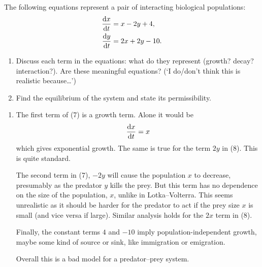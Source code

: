 \documentclass[a4paper,12pt]{article}
\begin{document}
\begin{enumerate}
    { %
      The following equations represent a pair of interacting biological populations:
      \begin{align}
        \fd{x}{t} &= x -2y + 4,\\
        \fd{y}{t} &= 2x + 2y -10.
      \end{align}
      \begin{enumerate}
        \item Discuss each term in the equations: what do they represent (growth? decay? interaction?). Are these meaningful equations? (`I do/don't think this is realistic because\dots')
        \item Find the equilibrium of the system and state its permissibility. %
      \end{enumerate}
    }
    { %
      \begin{enumerate}
        \item
          The first term of (7) is a growth term. Alone it would be
          \begin{equation}
            \fd{x}{t} = x
          \end{equation}
          which gives exponential growth. The same is true for the term $2y$ in (8). This is quite standard.

          The second term in (7), $-2y$ will cause the population $x$ to decrease, presumably as the predator $y$ kills the prey. But this term has no dependence on the size of the population, $x$, unlike in Lotka--Volterra. This seems unrealistic as it should be harder for the predator to act if the prey size $x$ is small (and vice versa if large). Similar analysis holds for the $2x$ term in (8).

          Finally, the constant terms $4$ and $-10$ imply population-independent growth, maybe some kind of source or sink, like immigration or emigration.

          Overall this is a bad model for a predator--prey  system.
          
\end{enumerate}}
\end{enumerate}
\end{document}
